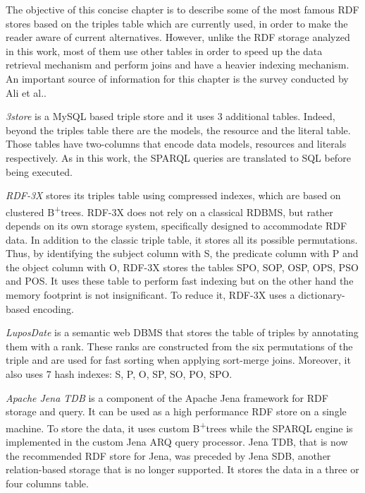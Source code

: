 \documentclass[10pt, a4paper]{report}
\begin{document}
\label{chapter:literature_review}

The objective of this concise chapter is to describe some of the most famous RDF stores based on the triples table which are currently used, in order to make the reader aware of current alternatives. However, unlike the RDF storage analyzed in this work, most of them use other tables in order to speed up the data retrieval mechanism and perform joins and have a heavier indexing mechanism. An important source of information for this chapter is the survey conducted by Ali et al.\cite{rdf_store_survey}.

\textit{3store}\cite{3store} is a MySQL based triple store and it uses 3 additional tables. Indeed, beyond the triples table there are the models, the resource and the literal table. Those tables have two-columns that encode data models, resources and literals respectively. As in this work, the SPARQL queries are translated to SQL before being executed.

\textit{RDF-3X}\cite{rdf3x} stores its triples table using compressed indexes, which are based on clustered B\textsuperscript{+}trees. RDF-3X does not rely on a classical RDBMS, but rather depends on its own storage system, specifically designed to accommodate RDF data. In addition to the classic triple table, it stores all its possible permutations. Thus, by identifying the subject column with S, the predicate column with P and the object column with O, RDF-3X stores the tables SPO, SOP, OSP, OPS, PSO and POS. It uses these table to perform fast indexing but on the other hand the memory footprint is not insignificant. To reduce it, RDF-3X uses a dictionary-based encoding.

\textit{LuposDate}\cite{luposdate} is a semantic web DBMS that stores the table of triples by annotating them with a rank. These ranks are constructed from the six permutations of the triple and are used for fast sorting when applying sort-merge joins. Moreover, it also uses 7 hash indexes: S, P, O, SP, SO, PO, SPO.

\textit{Apache Jena TDB}\cite{jena_tdb} is a component of the Apache Jena\cite{jena} framework for RDF storage and query. It can be used as a high performance RDF store on a single machine. To store the data, it uses custom B\textsuperscript{+}trees while the SPARQL engine is implemented in the custom Jena ARQ\cite{jena_arq} query processor. Jena TDB, that is now the recommended RDF store for Jena, was preceded by Jena SDB\cite{jena_sdb}, another relation-based storage that is no longer supported. It stores the data in a three or four columns table.
\end{document}
